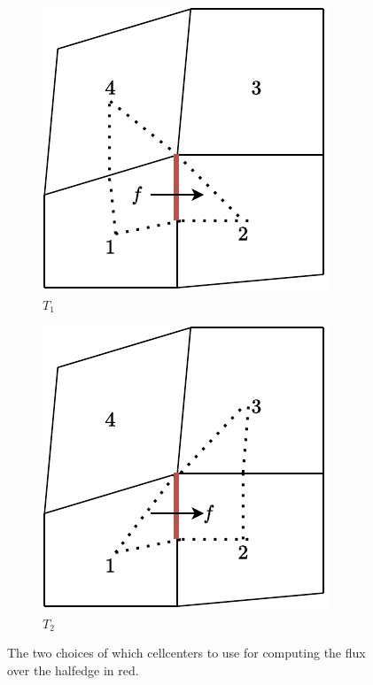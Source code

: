 \documentclass[../Main/main.tex]{subfiles}
\begin{document}
\begin{figure}[H]
	\centering
	\begin{subfigure}[b]{0.4\textwidth}
		\centering
		\includegraphics[width=\textwidth]{left choice.pdf}
		\caption{$T_1$}
	\end{subfigure}
	\hfill
	\begin{subfigure}[b]{0.4\textwidth}
		\centering
		\includegraphics[width=\textwidth]{right choice.pdf}
		\caption{$T_2$}
		\label{fig:three sin x}
	\end{subfigure}
	\caption{The two choices of which cellcenters to use for computing the flux over the halfedge in red.}
	\label{fig:two choices}
\end{figure}
\end{document}
